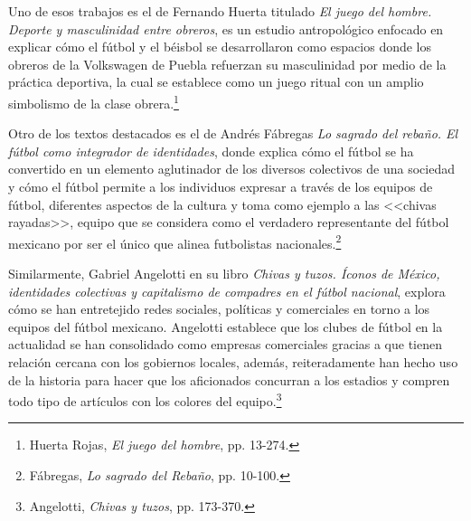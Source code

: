 \documentclass[11pt,a5paper,twoside]{book} %
\begin{document}
Uno de esos trabajos es el de Fernando Huerta titulado \emph{El juego del hombre. Deporte
y masculinidad entre obreros}, es un estudio antropológico enfocado en explicar cómo el
fútbol y el béisbol se desarrollaron como espacios donde los obreros de la Volkswagen de
Puebla refuerzan su masculinidad por medio de la práctica deportiva, la cual se establece
como un juego ritual con un amplio simbolismo de la clase obrera.\footnote{Huerta Rojas, \emph{El juego del hombre}, pp. 13-274.}

Otro de los textos destacados es el de Andrés Fábregas \emph{Lo sagrado del rebaño. El
fútbol como integrador de identidades}, donde explica cómo el fútbol se ha convertido en un
elemento aglutinador de los diversos colectivos de una sociedad y cómo el fútbol permite a
los individuos expresar a través de los equipos de fútbol, diferentes aspectos de la cultura y toma como ejemplo a las <<chivas rayadas>>, equipo que se considera como el verdadero representante del fútbol mexicano por ser el único que alinea futbolistas nacionales.\footnote{Fábregas, \emph{Lo sagrado del Rebaño}, pp. 10-100.}

Similarmente, Gabriel Angelotti en su libro \emph{Chivas y tuzos. Íconos de México,
identidades colectivas y capitalismo de compadres en el fútbol nacional}, explora cómo se
han entretejido redes sociales, políticas y comerciales en torno a los equipos del fútbol
mexicano. Angelotti establece que los clubes de fútbol en la actualidad se han consolidado
como empresas comerciales gracias a que tienen relación cercana con los gobiernos locales, además, reiteradamente han hecho uso de la historia para hacer que los aficionados concurran a los estadios y compren todo tipo de artículos con los colores del equipo.\footnote{Angelotti, \emph{Chivas y tuzos}, pp. 173-370.}
\end{document}
